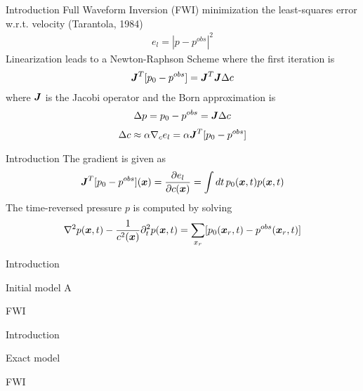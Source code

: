 \documentclass[xcolor=dvipsnames]{beamer}
\begin{document}
\begin{frame}{Introduction}
Full Waveform Inversion (FWI) 
minimization the least-squares error w.r.t. velocity (Tarantola, 1984) 
\begin{eqnarray}
  e_l = |p-p^{obs}|^2
\end{eqnarray}
Linearization leads to a Newton-Raphson Scheme
where the first iteration is
\begin{eqnarray}
  \mbox{\boldmath $J$}^T [p_0-p^{obs}]= \mbox{\boldmath $J$}^T\mbox{\boldmath $J$} \Delta c 
\end{eqnarray}
where $\mbox{\boldmath $J$}$ is the Jacobi operator and the Born approximation is
\begin{eqnarray}
 \Delta p = p_0-p^{obs}=\mbox{\boldmath $J$} \Delta c 
\end{eqnarray}
\begin{eqnarray}
  \Delta c \approx \alpha \nabla_c e_l = \alpha \mbox{\boldmath $J$}^T [p_0-p^{obs}]
\end{eqnarray}
\end{frame}
\begin{frame}{Introduction}
The gradient is given as
\begin{eqnarray}
  \mbox{\boldmath $J$}^T[p_0-p^{obs}](\mbox{\boldmath $x$}) = \frac{\partial e_l}{\partial c(\mbox{\boldmath $x$})} =\int dt\, p_0(\mbox{\boldmath $x$},t)p(\mbox{\boldmath $x$},t)
\end{eqnarray}
The time-reversed pressure $p$ is computed by solving
\begin{eqnarray}
  \nabla^2 p(\mbox{\boldmath $x$},t) - \frac{1}{c^2(\mbox{\boldmath $x$})} \partial^2_t p(\mbox{\boldmath $x$},t) 
           = \sum_{x_r}[p_0(\mbox{\boldmath $x$}_r,t)-p^{obs}(\mbox{\boldmath $x$}_r,t)]
\end{eqnarray}
\end{frame}
\begin{frame}{Introduction}

{Initial model A}\\


{FWI}\\


\end{frame}
\begin{frame}{Introduction}

{Exact model}\\


{FWI}\\


\end{frame}
\end{document}
